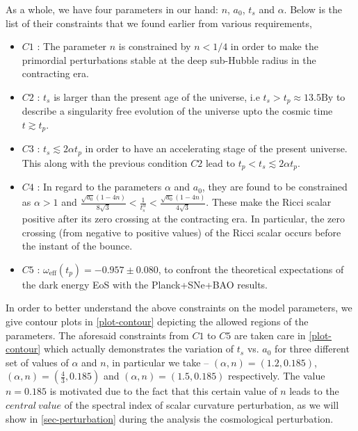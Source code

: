 \documentclass{article}
\begin{document}
As a whole, we have four parameters in our hand: $n$, $a_0$, $t_s$ and $\alpha$. Below is the list of their constraints that we found earlier from 
various requirements,
\begin{itemize}
 \item $C1$ : The parameter $n$ is constrained by $n < 1/4$ in order to make the primordial perturbations stable at the deep sub-Hubble radius 
 in the contracting era.
 
 \item $C2$ : $t_s$ is larger than the present age of the universe, i.e $t_s > t_p \approx 13.5\mathrm{By}$ to describe a singularity free evolution 
 of the universe upto the cosmic time $t \gtrsim t_p$.
 
 \item $C3$ : $t_s \lesssim 2\alpha t_p$ in order to have an accelerating stage of the present universe. This along with the previous condition 
 $C2$ lead to $t_p < t_s \lesssim 2\alpha t_p$.
 
 \item $C4$ : In regard to the parameters $\alpha$ and $a_0$, they are found to be constrained as $\alpha > 1$ and 
 $\frac{\sqrt{a_0}\left(1 - 4n\right)}{8\sqrt{3}} < \frac{1}{t_s^{\alpha}} < \frac{\sqrt{a_0}\left(1 - 4n\right)}{4\sqrt{3}}$. These make 
 the Ricci scalar positive after its zero crossing at the contracting era. In particular, the zero crossing (from negative to positive values) of the 
 Ricci scalar occurs before the instant of the bounce.
 
 \item $C5$ : $\omega_\mathrm{eff}(t_p) = -0.957 \pm 0.080$, to confront the theoretical expectations of the dark energy EoS with the Planck+SNe+BAO 
 results.
 \end{itemize}
 
 In order to better understand the above constraints on the model parameters, we give contour plots in \ref{plot-contour} depicting the allowed 
 regions of the parameters. The aforesaid constraints from $C1$ to $C5$ are taken care in 
 \ref{plot-contour} which actually demonstrates the variation of $t_s$ vs. $a_0$ for three different set of 
 values of $\alpha$ and $n$, in particular we take -- $(\alpha,n) = (1.2,0.185)$, $(\alpha,n) = (\frac{4}{3},0.185)$ and 
 $(\alpha,n) = (1.5,0.185)$ respectively. The value $n = 0.185$ is motivated due to the fact that this certain value of $n$ 
 leads to the $central~value$ of the spectral index of scalar curvature perturbation, as we will show 
 in \ref{sec-perturbation} during the analysis the cosmological perturbation.
 
\end{document}
